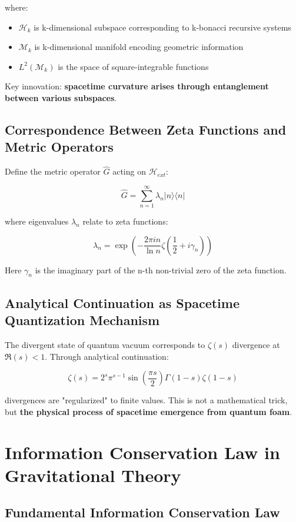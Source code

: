 \documentclass[12pt,a4paper]{article}
\begin{document}
where:
\begin{itemize}
\item $\mathcal{H}_k$ is k-dimensional subspace corresponding to k-bonacci recursive systems
\item $\mathcal{M}_k$ is k-dimensional manifold encoding geometric information
\item $L^2(\mathcal{M}_k)$ is the space of square-integrable functions
\end{itemize}

Key innovation: \textbf{spacetime curvature arises through entanglement between various subspaces}.

\subsection{Correspondence Between Zeta Functions and Metric Operators}

Define the metric operator $\hat{G}$ acting on $\mathcal{H}_{ext}$:

$$\hat{G} = \sum_{n=1}^{\infty} \lambda_n |n\rangle \langle n|$$

where eigenvalues $\lambda_n$ relate to zeta functions:

$$\lambda_n = \exp\left(-\frac{2\pi i n}{\ln n} \zeta\left(\frac{1}{2} + i\gamma_n\right)\right)$$

Here $\gamma_n$ is the imaginary part of the n-th non-trivial zero of the zeta function.

\subsection{Analytical Continuation as Spacetime Quantization Mechanism}

The divergent state of quantum vacuum corresponds to $\zeta(s)$ divergence at $\Re(s) < 1$. Through analytical continuation:

$$\zeta(s) = 2^s \pi^{s-1} \sin\left(\frac{\pi s}{2}\right) \Gamma(1-s) \zeta(1-s)$$

divergences are "regularized" to finite values. This is not a mathematical trick, but \textbf{the physical process of spacetime emergence from quantum foam}.

\section{Information Conservation Law in Gravitational Theory}

\subsection{Fundamental Information Conservation Law}
\end{document}
